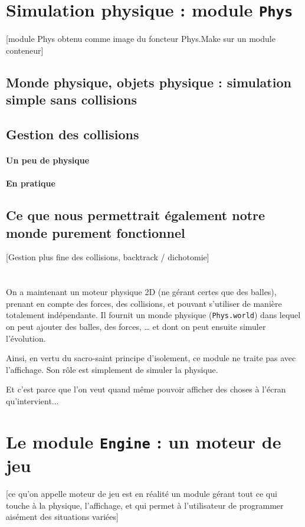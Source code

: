 \documentclass[a4paper]{scrartcl}
\begin{document}
\section{Simulation physique : module \texttt{Phys}}
[module Phys obtenu comme image du foncteur Phys.Make sur un module
conteneur]
\subsection{Monde physique, objets physique : simulation simple sans
  collisions}
\subsection{Gestion des collisions}
\paragraph{Un peu de physique}
\paragraph{En pratique}
\subsection{Ce que nous permettrait également notre monde purement
  fonctionnel}
[Gestion plus fine des collisions, backtrack / dichotomie]

\section*{}
On a maintenant un moteur physique 2D (ne gérant certes que des
balles), prenant en compte des forces, des collisions, et pouvant
s'utiliser de manière totalement indépendante. Il fournit un monde
physique (\texttt{Phys.world}) dans lequel on peut ajouter des balles,
des forces, … et dont on peut ensuite simuler l'évolution.

Ainsi, en vertu du sacro-saint principe d'isolement, ce module ne
traite pas avec l'affichage. Son rôle est simplement de simuler la
physique.

Et c'est parce que l'on veut quand même pouvoir afficher des choses à
l'écran qu'intervient...

\section{Le module \texttt{Engine} : un moteur de jeu}

[ce qu'on appelle moteur de jeu est en réalité un module gérant tout
ce qui touche à la physique, l'affichage, et qui permet à
l'utilisateur de programmer aisément des situations variées]
\end{document}
